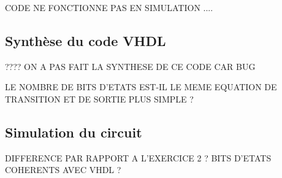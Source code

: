 \documentclass[11pt]{report}
\begin{document}
CODE NE FONCTIONNE PAS EN SIMULATION ....


\subsection{ Synthèse du code VHDL }

???? ON A PAS FAIT LA SYNTHESE DE CE CODE CAR BUG

LE NOMBRE DE BITS D'ETATS EST-IL LE MEME
EQUATION DE TRANSITION ET DE SORTIE PLUS SIMPLE ? 

 
  \subsection{ Simulation du circuit}
  
DIFFERENCE PAR RAPPORT A L'EXERCICE 2 ? BITS D'ETATS COHERENTS AVEC VHDL ? 

  
  
\end{document}
